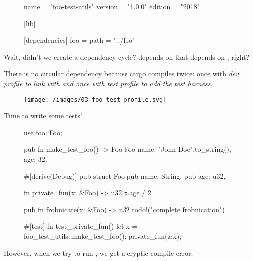 \documentclass{article}
\begin{document}
\begin{figure}
\begin{code}[good]
[package]
name = "foo-test-utils"
version = "1.0.0"
edition = "2018"

[lib]

[dependencies]
foo = { path = "../foo" }
\end{code}
\end{figure}

Wait, didn't we create a dependency cycle?
 depends on  that depends on , right?

There is no circular dependency because cargo compiles  twice: once with \em{dev} profile to link with  and once with \em{test} profile to add the test harness.

\begin{figure}[grayscale-diagram]
  \texttt{[image: /images/03-foo-test-profile.svg]}
\end{figure}

Time to write some tests!

\begin{figure}
\begin{code}[good]
use foo::Foo;

pub fn make_test_foo() -> Foo {
    Foo {
        name: "John Doe".to_string(),
        age: 32,
    }
}
\end{code}
\end{figure}

\begin{figure}
\begin{code}[bad]
#[derive(Debug)]
pub struct Foo {
    pub name: String,
    pub age: u32,
}

fn private_fun(x: &Foo) -> u32 {
    x.age / 2
}

pub fn frobnicate(x: &Foo) -> u32 {
    todo!("complete frobnication")
}

#[test]
fn test_private_fun() {
    let x = foo_test_utils::make_test_foo();
    private_fun(&x);
}
\end{code}
\end{figure}

However, when we try to run , we get a cryptic compile error:
\end{document}
